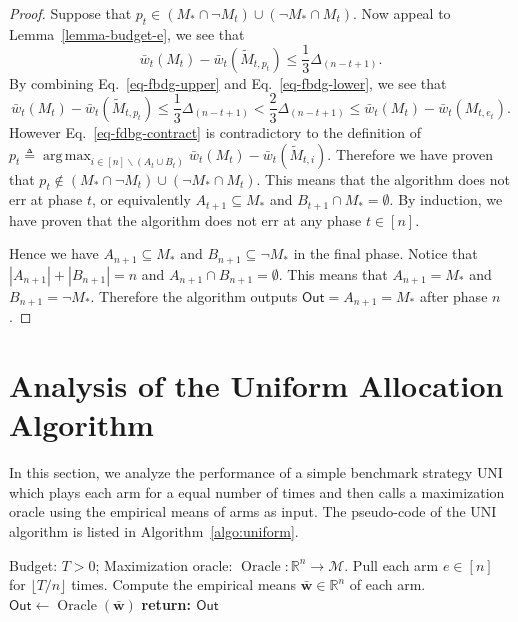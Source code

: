 \documentclass{article}
\newcommand{\Uniform}{{\small \textsf{UNI}}\xspace}
\newcommand{\M}{\mathcal M}
\newcommand{\del}{\backslash}
\newcommand{\RR}{\mathbb R}
\DeclareMathOperator*{\argmax}{arg\,max}
\DeclareMathOperator{\Oracle}{Oracle}
\newcommand{\out}{\mathsf{Out}}
\renewcommand{\vec}[1]{\boldsymbol{#1}}
\begin{document}
\begin{proof}
Suppose that $p_t \in (M_* \cap \neg M_t) \cup (\neg M_* \cap M_t)$.
Now appeal to Lemma~\ref{lemma-budget-e}, we see that
\begin{equation}
\label{eq-fbdg-lower}
\bar w_t(M_t) - \bar w_t(\tilde M_{t,p_t}) \le \frac{1}{3} \Delta_{(n-t+1)}.
\end{equation}
By combining Eq.~\eqref{eq-fbdg-upper} and Eq.~\eqref{eq-fbdg-lower}, we see that
\begin{equation}
\bar w_t(M_t) - \bar w_t(\tilde M_{t,p_t}) \le \frac{1}{3} \Delta_{(n-t+1)} < \frac{2}3 \Delta_{(n-t+1)} \le \bar w_t(M_t)- \bar w_t(M_{t,e_t}).
\label{eq-fdbg-contract}
\end{equation}
However Eq.~\eqref{eq-fdbg-contract} is contradictory to the definition of $p_t \triangleq \argmax_{i\in [n]\del (A_t\cup B_t)} \bar w_t(M_t)- \bar w_t(\tilde M_{t,i})$.
Therefore we have proven that $p_t \not\in (M_* \cap \neg M_t) \cup (\neg M_* \cap M_t)$.
This means that the algorithm does not err at phase $t$, or equivalently $A_{t+1} \subseteq M_*$ and $B_{t+1}\cap M_* = \emptyset$.
By induction, we have proven that the algorithm does not err at any phase $t\in[n]$.

Hence we have $A_{n+1} \subseteq M_*$ and $B_{n+1}\subseteq \neg M_*$ in the final phase.
Notice that $|A_{n+1}| + |B_{n+1}| = n$ and $A_{n+1}\cap B_{n+1}=\emptyset$. This means that $A_{n+1} = M_*$ and $B_{n+1} = \neg M_*$.
Therefore the algorithm outputs $\out=A_{n+1}=M_*$ after phase $n$.
\end{proof}


\section{Analysis of the Uniform Allocation Algorithm}
\label{section:uniform}
In this section, we analyze the performance of a simple benchmark strategy \Uniform which plays each arm for a equal number of times and then calls a maximization oracle using the empirical means of arms as input.
The pseudo-code of the \Uniform algorithm is listed in Algorithm~\ref{algo:uniform}.

\begin{algorithm}[htbp]
{
\small
\begin{algorithmic}[1]
\Require Budget: $T>0$; Maximization oracle: $\Oracle: \RR^n \rightarrow \M$.
\State Pull each arm $e\in [n]$ for $\lfloor T/n\rfloor$ times.
\State Compute the empirical means $\vec {\bar w} \in \RR^n$ of each arm.
\State $\out \gets \Oracle(\vec {\bar w})$
\State \textbf{return: $\out$} 
\end{algorithmic}
\caption{\Uniform: Uniform Allocation}
\label{algo:uniform}
}
\end{algorithm}
\end{document}
